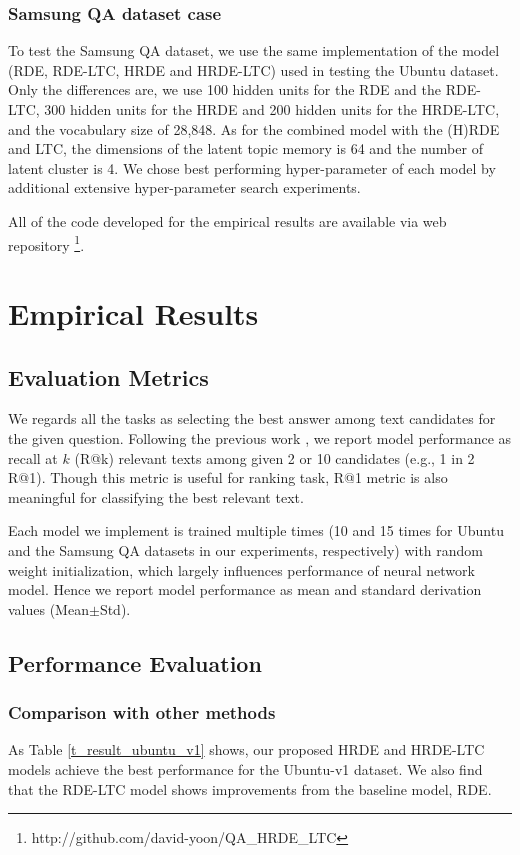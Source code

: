 \documentclass[11pt,a4paper]{article}
\begin{document}
\subsubsection{Samsung QA dataset case} To test the Samsung QA dataset, we use the same implementation of the model (RDE, RDE-LTC, HRDE and HRDE-LTC) used in testing the Ubuntu dataset. Only the differences are, we use 100 hidden units for the RDE and the RDE-LTC, 300 hidden units for the HRDE and 200 hidden units for the HRDE-LTC, and the vocabulary size of 28,848. As for the combined model with the (H)RDE and LTC, the dimensions of the latent topic memory is 64 and the number of latent cluster is 4. We chose best performing hyper-parameter of each model by additional extensive hyper-parameter search experiments.

All of the code developed for the empirical results are available via web repository
\footnote{http://github.com/david-yoon/QA\_HRDE\_LTC}.


\section{Empirical Results}
\label{experiments}
\subsection{Evaluation Metrics}
We regards all the tasks as selecting the best answer among text candidates for the given question. Following the previous work \cite{lowe2015ubuntu}, we report model performance as recall at $k$ (R@k) relevant texts among given 2 or 10 candidates (e.g., 1 in 2 R@1). Though this metric is useful for ranking task, R@1 metric is also meaningful for classifying the best relevant text.

Each model we implement is trained multiple times (10 and 15 times for Ubuntu and the Samsung QA datasets in our experiments, respectively) with random weight initialization, which largely influences performance of neural network model. Hence we report model performance as mean and standard derivation values (Mean$\pm$Std).


\subsection{Performance Evaluation}
\subsubsection{Comparison with other methods}
As Table \ref{t_result_ubuntu_v1} shows, our proposed HRDE and HRDE-LTC models achieve the best performance for the Ubuntu-v1 dataset. We also find that the RDE-LTC model shows improvements from the baseline model, RDE. 
\end{document}
